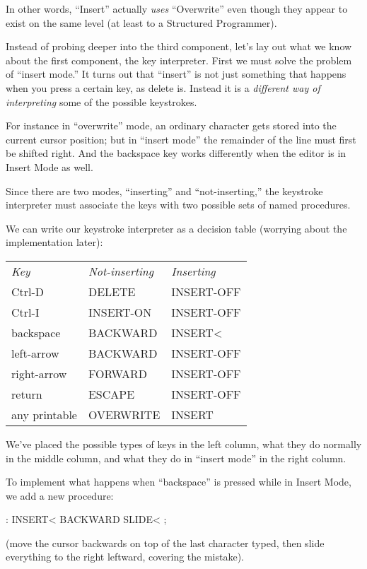 In other words, ``Insert'' actually \emph{uses} ``Overwrite'' even though
they appear to exist on the same level (at least to a Structured
Programmer).

Instead of probing deeper into the third component, let's lay out
what we know about the first component, the key interpreter. First we
must solve the problem of ``insert mode.'' It turns out that ``insert'' is
not just something that happens when you press a certain key, as
delete is. Instead it is a \emph{different way of interpreting}
some of the possible keystrokes.

For instance in ``overwrite'' mode, an ordinary character gets stored
into the current cursor position; but in ``insert mode'' the remainder
of the line must first be shifted right. And the backspace key works
differently when the editor is in Insert Mode as well.

Since there are two modes, ``inserting'' and ``not-inserting,'' the
keystroke interpreter must associate the keys with two possible sets of
named procedures.

We can write our keystroke interpreter as a decision table (worrying
about the implementation later):

\bigskip
\begin{tabular}{>{\ttfamily}l>{\ttfamily}l>{\ttfamily}l}
\emph{\textrm{Key}} &\emph{\textrm{Not-inserting}}& \emph{\textrm{Inserting}}\\
Ctrl-D        & DELETE              & INSERT-OFF\\
Ctrl-I        & INSERT-ON           & INSERT-OFF\\
backspace      & BACKWARD            & INSERT<	 \\
left-arrow     & BACKWARD            & INSERT-OFF\\
right-arrow    & FORWARD             & INSERT-OFF\\
return         & ESCAPE              & INSERT-OFF\\
any printable  & OVERWRITE           & INSERT    \\
\end{tabular}
\bigskip

\noindent We've placed the possible types of keys in the left column,
what they do normally in the middle column, and what they do in
``insert mode'' in the right column.

To implement what happens when ``backspace'' is pressed while in
Insert Mode, we add a new procedure:

\begin{Code}
: INSERT<   BACKWARD  SLIDE< ;
\end{Code}
(move the cursor backwards on top of the last character typed, then slide
everything to the right leftward, covering the mistake).

